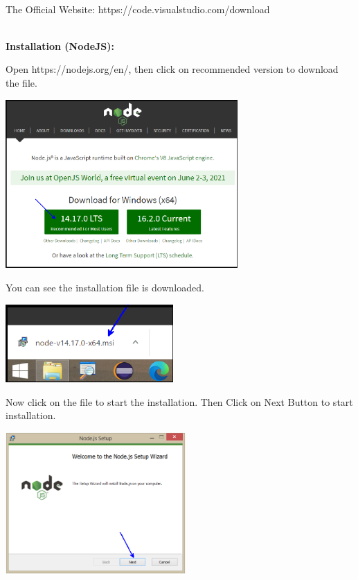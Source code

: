 \documentclass{article}
\begin{document}
\noindent \\
The Official Website:  https://code.visualstudio.com/download

\noindent 

\noindent 

\noindent 

\noindent \textbf{}

\noindent \textbf{}

\noindent \\
\textbf{Installation (NodeJS):}


 \textbf{ }Open https://nodejs.org/en/, then click on recommended version to download the file.


\begin{center}
	\noindent \includegraphics*[width=3.49in, height=2.53in]{IMG-06-06}
\end{center}

\noindent 


  You can see the installation file is downloaded.


\begin{center}
	\noindent \includegraphics*[width=2.52in, height=1.17in]{IMG-06-07}
\end{center}

\noindent 


  Now click on the file to start the installation. Then Click on Next Button to start installation.


\begin{center}
	\noindent \includegraphics*[width=2.71in, height=2.14in]{IMG-06-08}
\end{center}
\end{document}
